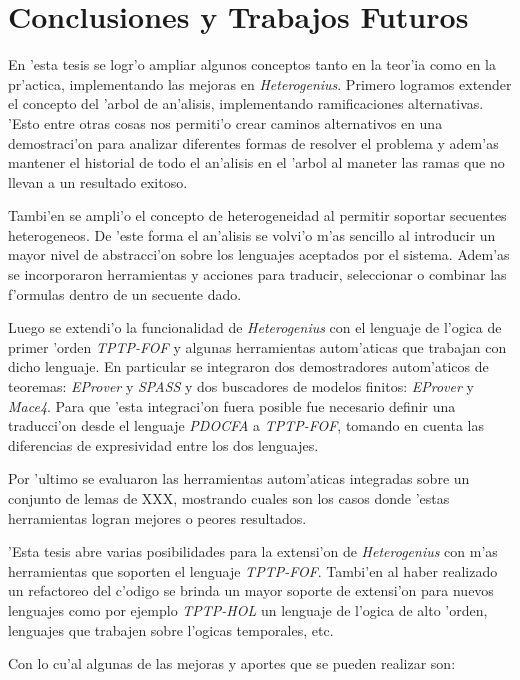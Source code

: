 \chapter{Conclusiones y Trabajos Futuros}

En 'esta tesis se logr'o ampliar algunos conceptos tanto en la teor'ia como en la pr'actica, implementando las mejoras en \textit{Heterogenius}. Primero logramos extender el concepto del 'arbol de an'alisis, implementando ramificaciones alternativas. 'Esto entre otras cosas nos permiti'o crear caminos alternativos en una demostraci'on para analizar diferentes formas de resolver el problema y adem'as mantener el historial de todo el an'alisis en el 'arbol al maneter las ramas que no llevan a un resultado exitoso.

Tambi'en se ampli'o el concepto de heterogeneidad al permitir soportar secuentes heterogeneos. De 'este forma el an'alisis se volvi'o m'as sencillo al introducir un mayor nivel de abstracci'on sobre los lenguajes aceptados por el sistema. Adem'as se incorporaron herramientas y acciones para traducir, seleccionar o combinar las f'ormulas dentro de un secuente dado.

Luego se extendi'o la funcionalidad de \textit{Heterogenius} con el lenguaje de l'ogica de primer 'orden \textit{TPTP-FOF} y algunas herramientas autom'aticas que trabajan con dicho lenguaje. En particular se integraron dos demostradores autom'aticos de teoremas: \textit{EProver} y \textit{SPASS} y dos buscadores de modelos finitos: \textit{EProver} y \textit{Mace4}. Para que 'esta integraci'on fuera posible fue necesario definir una traducci'on desde el lenguaje \textit{PDOCFA} a \textit{TPTP-FOF}, tomando en cuenta las diferencias de expresividad entre los dos lenguajes.

Por 'ultimo se evaluaron las herramientas autom'aticas integradas sobre un conjunto de lemas de XXX, mostrando cuales son los casos donde 'estas herramientas logran mejores o peores resultados.

'Esta tesis abre varias posibilidades para la extensi'on de \textit{Heterogenius} con m'as herramientas que soporten el lenguaje \textit{TPTP-FOF}. Tambi'en al haber realizado un refactoreo del c'odigo se brinda un mayor soporte de extensi'on para nuevos lenguajes como por ejemplo \textit{TPTP-HOL} un lenguaje de l'ogica de alto 'orden, lenguajes que trabajen sobre l'ogicas temporales, etc.

Con lo cu'al algunas de las mejoras y aportes que se pueden realizar son:

